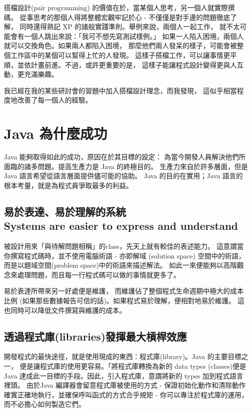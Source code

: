 搭檔設計(pair programming)
的價值在於，當某個人思考，另一個人就實際撰碼。
從事思考的那個人得將整體宏觀牢記於心 - 不僅僅是對手邊的問題徹底了解，
同時還得熟記 XP 的諸般實踐準則。舉例來說，兩個人一起工作，
就不太可能會有一個人跳出來說：「我可不想先寫測試樣例。」
如果一人陷入困境，兩個人就可以交換角色。如果兩人都陷入困境，
那麼他們兩人發呆的樣子，可能會被整個工作區中的某個可以幫得上忙的人發現。
這樣子搭檔工作，可以讓事情更平順，並依計畫前進。不過，或許更重要的是，
這樣子能讓程式設計變得更與人互動，更充滿樂趣。

我已經在我的某些研討會的習題中加入搭檔設計理念，而我發現，
這似乎相當程度地改善了每一個人的經驗。
\section{Java 為什麼成功}
Java 能夠取得如此的成功，原因在於其目標的設定：
為當今開發人員解決他們所面臨的諸多問題。提高生產力是 Java 的終極目的。
生產力來自於許多層面，但是 Java 語言希望從語言層面提供儘可能的協助。
Java 的目的在實用；Java 語言的根本考量，就是為程式員爭取最多的利益。
\subsection[易於表達、易於理解的系統]{易於表達、易於理解的系統\\
Systems are easier to express and understand}
被設計用來「與待解問題相稱」的class，先天上就有較佳的表述能力。
這意謂當你撰寫程式碼時，並不使用電腦術語 - 亦即解域 (solution space)
空間中的術語，而是以題域空間(problem space)中的術語來描述解法。
如此一來便能夠以高階觀念來處理問題，而且每一行程式碼可以做的事情就更多了。

易於表達所帶來另一好處便是維護，
而維護佔了整個程式生命週期中極大的成本比例
(如果那些數據報告可信的話)。如果程式易於理解，便相對地易於維護。
這也同時可以降低文件撰寫與維護的成本。

\subsection{透過程式庫(libraries)發揮最大槓桿效應}

開發程式的最快途徑，就是使用現成的東西：程式庫(library)。Java 的主要目標之一，
便是讓程式庫的使用更容易。「將程式庫轉換為新的 data types (classes)便是
Java 達成此一目標的手段。因此，引入程式庫，意謂將新的 types 加到程式語言裡頭。
由於Java 編譯器會留意程式庫被使用的方式 -
保證初始化動作和清除動作確實正確地執行，並確保呼叫函式的方式合乎規矩 -
你可以專注於程式庫的運用，而不必擔心如何製造它們。

